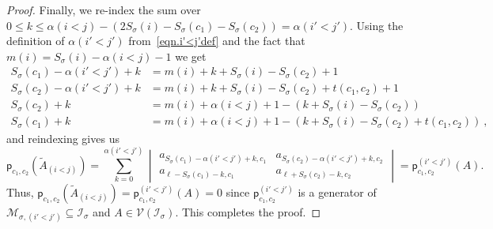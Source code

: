 \documentclass[10pt,a4paper]{amsart}
\newcommand{\al}{\alpha}
\newcommand{\ci}{\mathcal{I}}
\newcommand{\cm}{\mathcal{M}}
\newcommand{\cv}{\mathcal{V}}
\newcommand{\gs}{\sigma}
\newcommand{\mi}[1]{m(#1)}
\newcommand{\pl}{\mathsf{p}}
\begin{document}
\begin{proof}
Finally, we re-index the sum over $0\leq k \leq \al(i<j) - \left( 2S_\gs(i) - S_\gs(c_1)-S_\gs(c_2) \right) = \al (i'<j')$. Using the definition of $\al(i'<j')$ from~\eqref{eqn.i'<j'def} and the fact that $\mi{i} = S_\gs(i)-\al(i<j)-1$ we get  
\begin{align*}
S_\gs(c_1) - \al(i'<j')+k & = \mi{i} + k + S_\gs(i)-S_{\gs}(c_2)+1  \\
S_\gs(c_2) - \al(i'<j')+k &= \mi{i} + k + S_\gs(i)-S_{\gs}(c_2) + t(c_1, c_2)+1 \\
S_\gs(c_2)+k & = \mi{i} +\al(i<j) +1 - \left( k + S_\gs(i)-S_\gs(c_2) \right) \\
S_\gs(c_1)+k & = \mi{i} +\al(i<j) +1 - \left( k + S_\gs(i)-S_\gs(c_2) +t(c_1,c_2)  \right) \ ,
\end{align*}
and reindexing gives us 
\[
\pl_{c_1, c_2}(\widetilde A_{(i<j)})  = \sum_{k=0}^{\al(i'<j')} \begin{vmatrix} a_{S_\gs(c_1)-\al(i'<j')+k, c_1} &  a_{S_\gs(c_2)-\al(i'<j')+k, c_2} \\  a_{\ell-S_\gs(c_1)-k,c_1}  & a_{\ell + S_\gs(c_2) - k, c_2 }\end{vmatrix} = \pl_{c_1, c_2}^{(i'<j')} (A).
\]
Thus, $\pl_{c_1, c_2}(\widetilde A_{(i<j)}) = \pl_{c_1, c_2}^{(i'<j')} (A)=0$ since $\pl_{c_1, c_2}^{(i'<j')}$ is a generator of $\cm_{\gs, (i'<j')} \subseteq \ci_\gs$ and $A\in \cv(\ci_\gs)$. This completes the proof. 
\end{proof}
\end{document}
